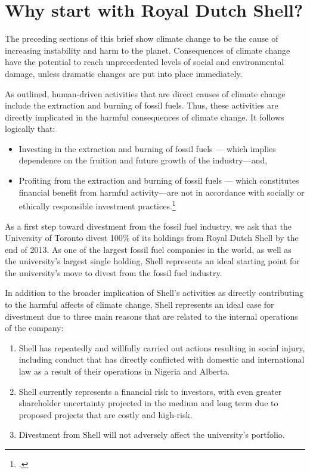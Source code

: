 
		\section{Why start with Royal Dutch Shell?}

The preceding sections of this brief show climate change to be the cause of increasing instability and harm to the planet. 
Consequences of climate change have the potential to reach unprecedented levels of social and environmental damage, unless dramatic changes are put into place immediately. 


As outlined, human-driven activities that are direct causes of climate change include the extraction and burning of fossil fuels. 
Thus, these activities are directly implicated in the harmful consequences of climate change. 
It follows logically that:
\begin{itemize}
	\item Investing in the extraction and burning of fossil fuels --- which implies dependence on the fruition and future growth of the industry—and, 
	\item Profiting from the extraction and burning of fossil fuels --- which constitutes financial benefit from harmful activity—are not in accordance with socially or ethically responsible investment practices.\footcite[][]{Richardson_2008}
\end{itemize}
As a first step toward divestment from the fossil fuel industry, we ask that the University of Toronto divest 100\% of its holdings from Royal Dutch Shell by the end of 2013. 
As one of the largest fossil fuel companies in the world, as well as the university’s largest single holding, Shell represents an ideal starting point for the university’s move to divest from the fossil fuel industry.
		
		
			
In addition to the broader implication of Shell's activities as directly contributing to the harmful affects of climate change, Shell represents an ideal case for divestment due to three main reasons that are related to the internal operations of the company: 
\begin{enumerate}
	\item Shell has repeatedly and willfully carried out actions resulting in social injury, including conduct that has directly conflicted with domestic and international law as a result of their operations in Nigeria and Alberta.
	\item Shell currently represents a financial risk to investors, with even greater shareholder uncertainty projected in the medium and long term due to proposed projects that are costly and high-risk.
	\item Divestment from Shell will not adversely affect the university’s portfolio.
\end{enumerate}

